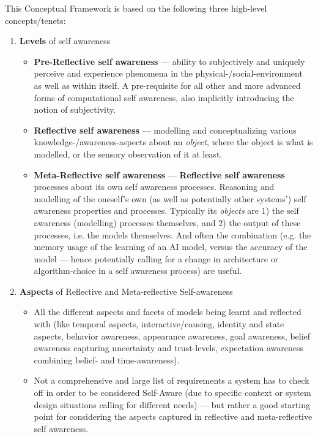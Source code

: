 	This Conceptual Framework is based on the following three high-level concepts/tenets:
	\begin{enumerate}
		\item \textbf{Levels} of self awareness
		\begin{itemize}
			\item \textbf{Pre-Reflective self awareness} — ability to subjectively and uniquely perceive and experience phenomena in the physical-/social-environment as well as within itself. A pre-requisite for all other and more advanced forms of computational self awareness, also implicitly introducing the notion of subjectivity.
			\item \textbf{Reflective self awareness} — modelling and conceptualizing various knowledge-/awareness-aspects about an \textit{object}, where the object is what is modelled, or the sensory observation of it at least.
			\item \textbf{Meta-Reflective self awareness} — \textbf{Reflective self awareness} processes about its own self awareness processes. Reasoning and modelling of the oneself's own (as well as potentially other systems') self awareness properties and processes. Typically its \textit{objects} are 1) the self awareness (modelling) processes themselves, and 2) the output of these processes, i.e. the models themselves. And often the combination (e.g. the memory usage of the learning of an AI model, versus the accuracy of the model — hence potentially calling for a change in architecture or algorithm-choice in a self awareness process) are useful.
		\end{itemize}
		
		\item \textbf{Aspects} of Reflective and Meta-reflective Self-awareness
			\begin{itemize}
				\item All the different aspects and facets of models being learnt and reflected with (like temporal aspects, interactive/causing, identity and state aspects, behavior awareness, appearance awareness, goal awareness, belief awareness capturing uncertainty and trust-levels, expectation awareness combining belief- and time-awareness).
				\item Not a comprehensive and large list of requirements a system has to check off in order to be considered Self-Aware (due to specific context or system design situations calling for different needs) — but rather a good starting point for considering the aspects captured in reflective and meta-reflective self awareness.
			\end{itemize}
			

\end{enumerate}
